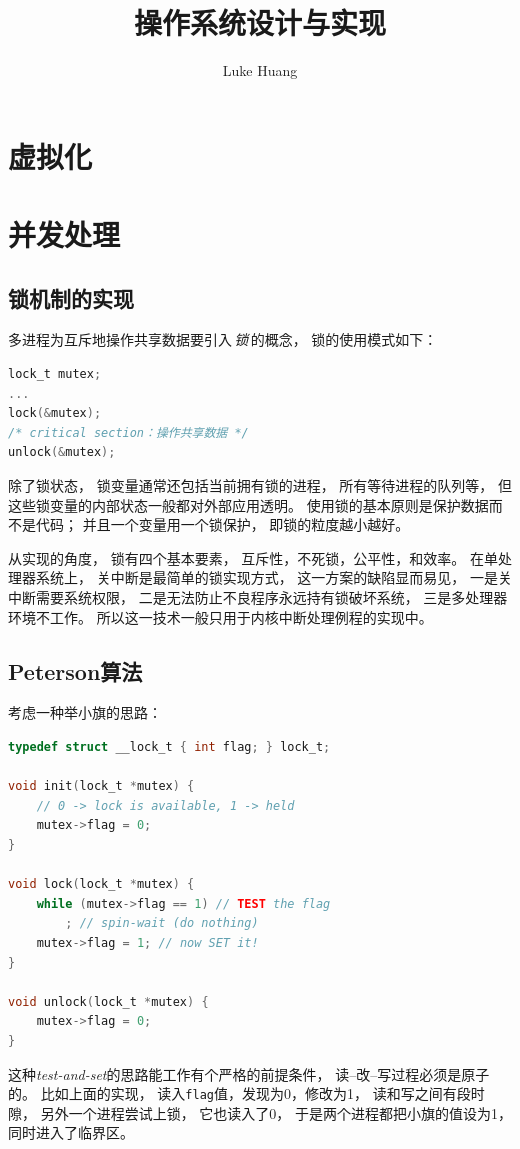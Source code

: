 \documentclass[11pt]{article}
\title{操作系统设计与实现}
\author{Luke Huang}
\begin{document}
\maketitle

\tableofcontents

\section{虚拟化}


\section{并发处理}
\subsection{锁机制的实现}
多进程为互斥地操作共享数据要引入\,{\em 锁}\,的概念，
锁的使用模式如下：
\begin{lstlisting}[language=C]
lock_t mutex;
...
lock(&mutex);
/* critical section：操作共享数据 */
unlock(&mutex);
  \end{lstlisting}
除了锁状态，
锁变量通常还包括当前拥有锁的进程，
所有等待进程的队列等，
但这些锁变量的内部状态一般都对外部应用透明。
使用锁的基本原则是保护数据而不是代码；
并且一个变量用一个锁保护，
即锁的粒度越小越好。

从实现的角度，
锁有四个基本要素，
互斥性，不死锁，公平性，和效率。
在单处理器系统上，
关中断是最简单的锁实现方式，
这一方案的缺陷显而易见，
一是关中断需要系统权限，
二是无法防止不良程序永远持有锁破坏系统，
三是多处理器环境不工作。
所以这一技术一般只用于内核中断处理例程的实现中。

\subsection{Peterson算法}
考虑一种举小旗的思路：
\begin{lstlisting}[language=C]
typedef struct __lock_t { int flag; } lock_t;

void init(lock_t *mutex) {
	// 0 -> lock is available, 1 -> held
	mutex->flag = 0;
}

void lock(lock_t *mutex) {
	while (mutex->flag == 1) // TEST the flag
		; // spin-wait (do nothing)
	mutex->flag = 1; // now SET it!
}

void unlock(lock_t *mutex) {
	mutex->flag = 0;
}
  \end{lstlisting}
这种{\em test-and-set}的思路能工作有个严格的前提条件，
读--改--写过程必须是原子的。
比如上面的实现，
读入\verb|flag|值，发现为0，修改为1，
读和写之间有段时隙，
另外一个进程尝试上锁，
它也读入了0，
于是两个进程都把小旗的值设为1，
同时进入了临界区。
\end{document}
